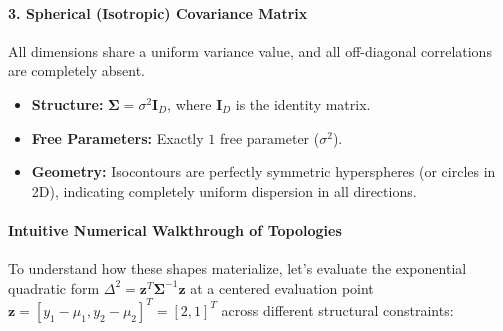 \documentclass{article}
\begin{document}
\paragraph{3. Spherical (Isotropic) Covariance Matrix}
All dimensions share a uniform variance value, and all off-diagonal correlations are completely absent.
\begin{itemize}
    \item \textbf{Structure:} $\boldsymbol{\Sigma} = \sigma^2 \mathbf{I}_D$, where $\mathbf{I}_D$ is the identity matrix.
    \item \textbf{Free Parameters:} Exactly $1$ free parameter ($\sigma^2$).
    \item \textbf{Geometry:} Isocontours are perfectly symmetric hyperspheres (or circles in 2D), indicating completely uniform dispersion in all directions.
\end{itemize}

\paragraph{Intuitive Numerical Walkthrough of Topologies}
To understand how these shapes materialize, let's evaluate the exponential quadratic form $\Delta^2 = \mathbf{z}^T \boldsymbol{\Sigma}^{-1} \mathbf{z}$ at a centered evaluation point $\mathbf{z} = [y_1 - \mu_1, y_2 - \mu_2]^T = [2, 1]^T$ across different structural constraints:
\end{document}

